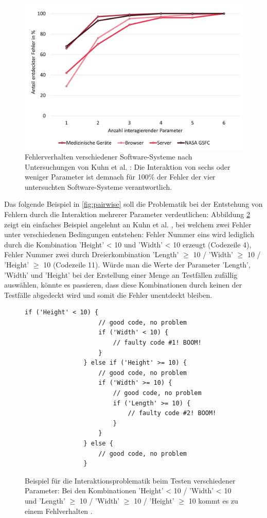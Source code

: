 \begin{figure}[!htb]
\centering
\includegraphics[width=0.6\columnwidth]{images/Fehler_Interaktion.jpg}
\caption{Fehlerverhalten verschiedener Software-Systeme nach Untersuchungen von Kuhn et al. \cite{kuhn2004error}: Die Interaktion von sechs oder weniger Parameter ist demnach für 100\% der Fehler der vier untersuchten Software-Systeme verantwortlich.}
\label{fig:fehlerInteraktion}
\end{figure}

Das folgende Beispiel in \autoref{fig:pairwise} soll die Problematik bei der Entstehung von Fehlern durch die Interaktion mehrerer Parameter verdeutlichen: Abbildung \ref{fig:pairwise} zeigt ein einfaches Beispiel angelehnt an Kuhn et al. \cite{kuhn2010practical}, bei welchem zwei Fehler unter verschiedenen Bedingungen entstehen: Fehler Nummer eins wird lediglich durch die Kombination 'Height' < 10 und 'Width' < 10 erzeugt (Codezeile 4), Fehler Nummer zwei durch Dreierkombination 'Length' $\geq$ 10 / 'Width' $\geq$ 10 / 'Height' $\geq$ 10 (Codezeile 11). Würde man die Werte der Parameter 'Length', 'Width' und 'Height' bei der Erstellung einer Menge an Testfällen zufällig auswählen, könnte es passieren, dass diese Kombinationen durch keinen der Testfälle abgedeckt wird und somit die Fehler unentdeckt bleiben.

\begin{figure}[!htb]
\lstset{language=Java}
\begin{lstlisting}[frame=single]
				if ('Height' < 10) {
					// good code, no problem
					if ('Width' < 10) {
						// faulty code #1! BOOM!
					}
				} else if ('Height' >= 10) {
					// good code, no problem
					if ('Width' >= 10) {
						// good code, no problem
						if ('Length' >= 10) {
							// faulty code #2! BOOM!
						}
					}
				} else {
					// good code, no problem
				}
\end{lstlisting}
\caption{Beispiel für die Interaktionsproblematik beim Testen verschiedener Parameter: Bei den Kombinationen 'Height' < 10 / 'Width' < 10 und 'Length' $\geq$ 10 / 'Width' $\geq$ 10 / 'Height' $\geq$ 10 kommt es zu einem Fehlverhalten \cite{kuhn2010practical}.}
\label{fig:pairwise}
\end{figure}

